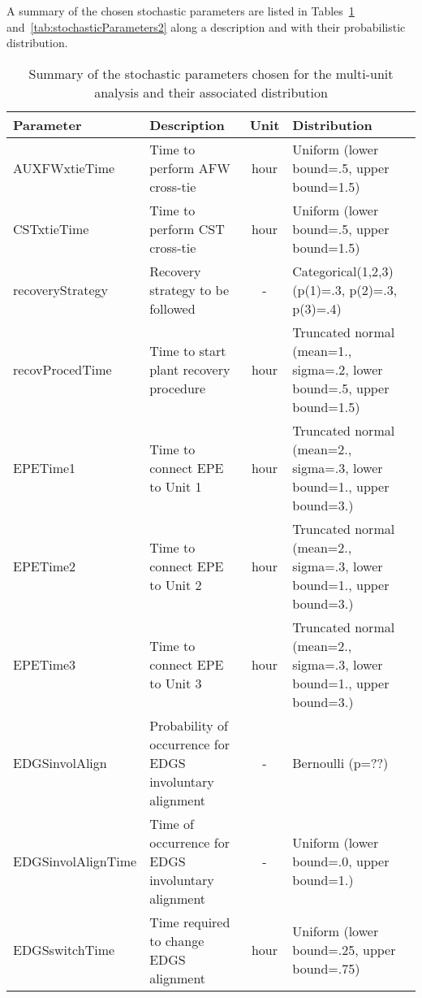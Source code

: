 A summary of the chosen stochastic parameters are listed in Tables~\ref{tab:stochasticParameters1} 
and~\ref{tab:stochasticParameters2}
along a description and with their probabilistic distribution.

\begin{table}
  \centering
  \begin{center}
      \begin{tabular}{ | l | p{5cm} | c | p{5cm} |}
        \hline
         Parameter          & Description                      & Unit   & Distribution                                         \\ \hline \hline
         AUXFWxtieTime      & Time to perform AFW cross-tie    & hour   & Uniform (lower bound=.5, upper bound=1.5)            \\ \hline
         CSTxtieTime        & Time to perform CST cross-tie    & hour   & Uniform (lower bound=.5, upper bound=1.5)            \\ \hline
         recoveryStrategy   & Recovery strategy to be followed & -      & Categorical(1,2,3) (p(1)=.3, p(2)=.3, p(3)=.4)       \\ \hline
         recovProcedTime    & Time to start plant recovery procedure    & hour        & Truncated normal (mean=1., sigma=.2, lower bound=.5, upper bound=1.5)       \\ \hline
         EPETime1           & Time to connect EPE to Unit 1    & hour   & Truncated normal (mean=2., sigma=.3, lower bound=1., upper bound=3.)   \\ \hline
         EPETime2           & Time to connect EPE to Unit 2    & hour   & Truncated normal (mean=2., sigma=.3, lower bound=1., upper bound=3.)   \\ \hline
         EPETime3           & Time to connect EPE to Unit 3    & hour   & Truncated normal (mean=2., sigma=.3, lower bound=1., upper bound=3.)   \\ \hline
         EDGSinvolAlign     & Probability of occurrence for EDGS involuntary alignment & -      & Bernoulli (p=??)                               \\ \hline
         EDGSinvolAlignTime & Time of occurrence for EDGS involuntary alignment        & -      & Uniform (lower bound=.0, upper bound=1.)       \\ \hline
         EDGSswitchTime     & Time required to change EDGS alignment       & hour  & Uniform (lower bound=.25, upper bound=.75)                  \\ 
        \hline
      \end{tabular}
  \end{center}
  \caption{Summary of the stochastic parameters chosen for the multi-unit analysis and their associated distribution}
  \label{tab:stochasticParameters1}
\end{table}

